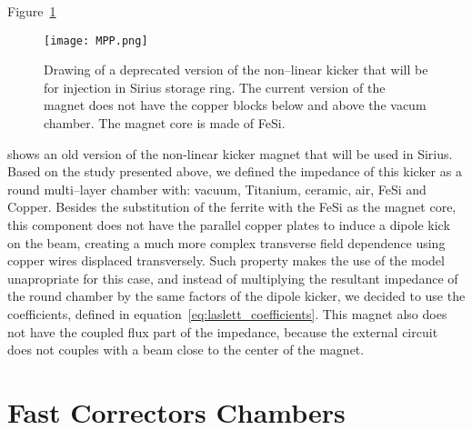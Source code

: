     Figure~\ref{fig:non_linear_kicker}
    \begin{figure}[t]
        \centering
        \texttt{[image: MPP.png]}
        \caption[Drawing of non--linear kicker magnet.]{Drawing of a deprecated version of the non--linear kicker that will be for injection in Sirius storage ring. The current version of the magnet does not have the copper blocks below and above the vacum chamber. The magnet core is made of FeSi.}
        \label{fig:non_linear_kicker}
    \end{figure}
    shows an old version of the non-linear kicker magnet that will be used in Sirius. Based on the study presented above, we defined the impedance of this kicker as a round multi--layer chamber with: vacuum, Titanium, ceramic, air, FeSi and Copper. Besides the substitution of the ferrite with the FeSi as the magnet core, this component does not have the parallel copper plates to induce a dipole kick on the beam, creating a much more complex transverse field dependence using copper wires displaced transversely.  Such property makes the use of the \citeauthor{Tsutsui2000} model unapropriate for this case, and instead of multiplying the resultant impedance of the round chamber by the same factors of the dipole kicker, we decided to use the \citeauthor{Laslett1963} coefficients, defined in equation~\eqref{eq:laslett_coefficients}. This magnet also does not have the coupled flux part of the impedance, because the external circuit does not couples with a beam close to the center of the magnet.

\section{Fast Correctors Chambers}

